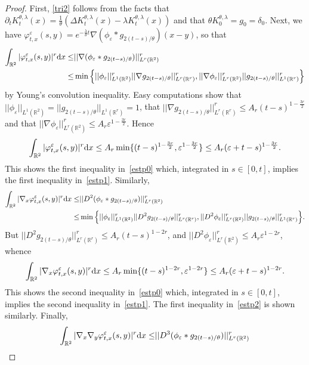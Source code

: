 \documentclass[11pt]{article}
\newcommand{\R}{\mathbb{R}}
\newcommand{\1}{\mathbbm{1}}
\newcommand{\dd}{{\rm d}}
\newcommand{\e}{\varepsilon}
\begin{document}
\begin{proof}
First, \eqref{tri2} follows from the facts that 
$\partial_t K^{\theta,\lambda}_t(x)=\frac1\theta(\Delta K^{\theta,\lambda}_t(x)-\lambda K^{\theta,\lambda}_t(x))$ and that
$\theta K^{\theta,\lambda}_0=g_0=\delta_0$.
Next, we have $\varphi^\e_{t,x}(s,y)=e^{-\frac \lambda\theta t} \nabla(\phi_\e\ast g_{2(t-s)/\theta})(x-y)$, so that
\begin{align*}
\int_{\R^2} |\varphi^\e_{t,x}(s,y)|^r \dd x \leq& ||\nabla(\phi_\e\ast g_{2(t-s)/\theta})||_{L^r(\R^2)}^r \\
\leq& \min\Big\{||\phi_\e||_{L^1(\R^2)}^r||\nabla g_{2(t-s)/\theta}||_{L^r(\R^r)}^r,
||\nabla \phi_\e||_{L^r(\R^2)}^r||g_{2(t-s)/\theta}||_{L^1(\R^r)}^r \Big\}
\end{align*}
by Young's convolution inequality. Easy computations show that $||\phi_\e||_{L^1(\R^2)}=
||g_{2(t-s)/\theta}||_{L^1(\R^r)}=1$, that $||\nabla g_{2(t-s)/\theta}||_{L^r(\R^r)}^r\leq A_r (t-s)^{1-\frac{3r}2}$
and that $||\nabla \phi_\e||_{L^r(\R^2)}^r \leq A_r \e^{1-\frac{3r}2}$. Hence
\begin{align*}
\int_{\R^2} |\varphi^\e_{t,x}(s,y)|^r \dd x \leq A_r \min\{(t-s)^{1-\frac{3r}2},\e^{1-\frac{3r}2}\}\leq 
A_r(\e+t-s)^{1-\frac{3r}2}.
\end{align*}
This shows the first inequality in~\eqref{estp0} which, integrated in $s\in [0,t]$, implies the first inequality 
in~\eqref{estp1}. Similarly,
\begin{align*}
\int_{\R^2} |\nabla_x\varphi^\e_{t,x}(s,y)|^r \dd x \leq& ||D^2(\phi_\e\ast g_{2(t-s)/\theta})||_{L^r(\R^2)}^r \\
\leq& \min\Big\{||\phi_\e||_{L^1(\R^2)}^r||D^2 g_{2(t-s)/\theta}||_{L^r(\R^r)}^r,
||D^2\phi_\e||_{L^r(\R^2)}^r||g_{2(t-s)/\theta}||_{L^1(\R^r)}^r \Big\}.
\end{align*}
But $||D^2 g_{2(t-s)/\theta}||_{L^r(\R^r)}^r\leq A_r (t-s)^{1-2r}$,
and $||D^2\phi_\e||_{L^r(\R^2)}^r \leq A_r \e^{1-2r}$, whence
\begin{align*}
\int_{\R^2} |\nabla_x\varphi^\e_{t,x}(s,y)|^r \dd x \leq A_r \min\{(t-s)^{1-2r},\e^{1-2r}\}\leq 
A_r(\e+t-s)^{1-2r}.
\end{align*}
This shows the second inequality in~\eqref{estp0} which, integrated in $s\in [0,t]$, implies the second inequality 
in~\eqref{estp1}. The first inequality in~\eqref{estp2} is shown similarly. Finally,
\begin{align*}
\int_{\R^2} |\nabla_x \nabla_y\varphi^\e_{t,x}(s,y)|^r \dd x \leq& ||D^3(\phi_\e\ast g_{2(t-s)/\theta})||_{L^r(\R^2)}^r \\

\end{align*}
\end{proof}
\end{document}
